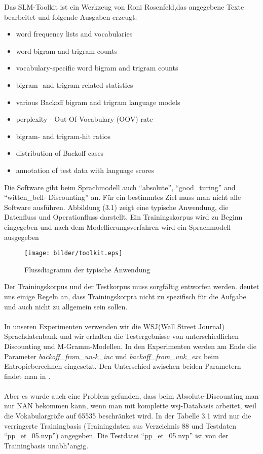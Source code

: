 Das SLM-Toolkit ist ein Werkzeug von Roni Rosenfeld,das angegebene Texte bearbeitet und folgende Ausgaben erzeugt\cite{int_slm_toolkit}:
\begin{itemize}
	\item word frequency lists and vocabularies
	\item word bigram and trigram counts
	\item vocabulary-specific word bigram and trigram counts
	\item bigram- and trigram-related statistics
	\item various Backoff bigram and trigram language models
	\item perplexity - Out-Of-Vocabulary (OOV) rate 
	\item bigram- and trigram-hit ratios
	\item distribution of Backoff cases 
	\item annotation of test data with language scores 
\end{itemize}
Die Software gibt beim Sprachmodell auch "`absolute"', "`good\_turing"' and "`witten\_bell- Discounting"' an.
F\"ur ein bestimmtes Ziel muss man nicht alle Software ausf\"uhren. Abbildung (3.1) zeigt eine typische Anwendung, die Datenfluss und Operationfluss darstellt.
Ein Trainingskorpus wird zu Beginn eingegeben und nach dem Modellierungsverfahren wird ein Sprachmodell ausgegeben
\begin{figure}[h]
	\centering
	\texttt{[image: bilder/toolkit.eps]}
	 \caption{Flussdiagramm der typische Anwendung}
  \label{fig:figure_2}
\end{figure}
Der Trainingskorpus und der Testkorpus muss sorgf\"altig entworfen werden. \cite{book_speech} deutet uns einige Regeln an, dass Trainingskorpra nicht zu spezifisch f\"ur die Aufgabe und auch nicht zu allgemein sein sollen.  
\\
\\
In unseren Experimenten verwenden wir die WSJ(Wall Street Journal) Sprachdatenbank und wir erhalten die Testergebnisse von unterschiedlichen Discounting und M-Gramm-Modellen. In den Experimenten werden am Ende die Parameter \emph{backoff\_from\_un-k\_inc} und \emph{backoff\_from\_unk\_exc} beim Entropieberechnen eingesetzt. Den Unterschied zwischen beiden Parametern findet man in \cite{int_slm_toolkit}.
\\
\\  
Aber es wurde auch eine Problem gefunden, dass beim Absolute-Discounting man nur NAN bekommen kann, wenn man mit komplette wsj-Databasis arbeitet, weil die Vokabulargr\"o\ss e auf 65535 beschr\"anket wird. In der Tabelle 3.1 wird nur die verringerte Trainingbasis (Trainingdaten aus Verzeichnis 88 und Testdaten "`pp\_et\_05.nvp"') angegeben. Die Testdatei "`pp\_et\_05.nvp"' ist von der Trainingbasis unabh"angig.
